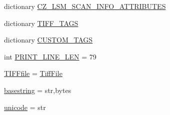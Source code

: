 \begin{DoxyCompactItemize}
dictionary \hyperlink{namespacetifffile_a9192b12a20198661f7ce2477725a21b6}{C\-Z\-\_\-\-L\-S\-M\-\_\-\-S\-C\-A\-N\-\_\-\-I\-N\-F\-O\-\_\-\-A\-T\-T\-R\-I\-B\-U\-T\-E\-S}
\item 
dictionary \hyperlink{namespacetifffile_aa57400e0d25c841e817dd0f2b6eaf329}{T\-I\-F\-F\-\_\-\-T\-A\-G\-S}
\item 
dictionary \hyperlink{namespacetifffile_a4e8177bd7dbfb24e650a49337b5b9b89}{C\-U\-S\-T\-O\-M\-\_\-\-T\-A\-G\-S}
\item 
int \hyperlink{namespacetifffile_aba60fb8bee718e1ac4434956652c21bb}{P\-R\-I\-N\-T\-\_\-\-L\-I\-N\-E\-\_\-\-L\-E\-N} = 79
\item 
\hyperlink{namespacetifffile_a2140a736b936d0bea51efb09e345480d}{T\-I\-F\-Ffile} = \hyperlink{classtifffile_1_1_tiff_file}{Tiff\-File}
\item 
\hyperlink{namespacetifffile_af891e253319a06953c5a9efe383b0ca0}{basestring} = str,bytes
\item 
\hyperlink{namespacetifffile_ad07470becc0badb369bf556d4c40b7d1}{unicode} = str
\end{DoxyCompactItemize}


